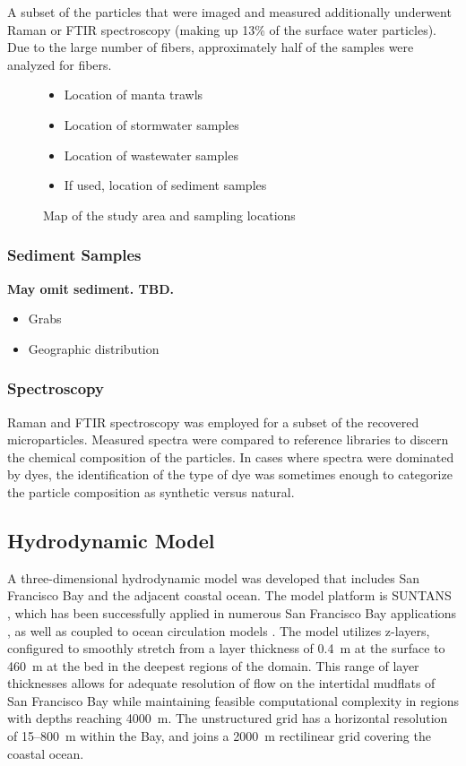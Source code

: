 \documentclass[draft]{jgr/agujournal2019}
\begin{document}
A subset of the particles that were imaged and measured additionally
underwent Raman or FTIR spectroscopy (making up 13\% of the surface
water particles). Due to the large number of fibers, approximately
half of the samples were analyzed for fibers.

\begin{figure}
\begin{itemize}
\item Location of manta trawls
\item Location of stormwater samples
\item Location of wastewater samples
\item If used, location of sediment samples
\end{itemize}
\caption{Map of the study area and sampling locations}
\label{overview_map}
\end{figure}

  
\subsubsection{Sediment Samples}

{\bf May omit sediment.  TBD.}
              
\begin{itemize}
\item Grabs
\item Geographic distribution
\end{itemize}

\subsubsection{Spectroscopy}

Raman and FTIR spectroscopy was employed for a subset of the recovered
microparticles. Measured spectra were compared to reference libraries
to discern the chemical composition of the particles.  In cases where
spectra were dominated by dyes, the identification of the type of dye
was sometimes enough to categorize the particle composition as synthetic
versus natural.

\subsection{Hydrodynamic Model}

A three-dimensional hydrodynamic model was developed that includes San
Francisco Bay and the adjacent coastal ocean. The model platform is
SUNTANS \cite{Fringer2006}, which has been successfully applied in
numerous San Francisco Bay applications
\cite{ChuaFringer2011,HollemanStacey2014}, as well as coupled to ocean
circulation models \cite{Rayson2018}. The model utilizes z-layers,
configured to smoothly stretch from a layer thickness of 0.4~m at the
surface to 460~m at the bed in the deepest regions of the domain.
This range of layer thicknesses allows for
adequate resolution of flow on the intertidal mudflats of San
Francisco Bay while maintaining feasible computational complexity
in regions with depths reaching 4000~m.  The unstructured grid
has a horizontal resolution of 15--800~m within the Bay, and joins
a 2000~m rectilinear grid covering the coastal ocean.
\end{document}
